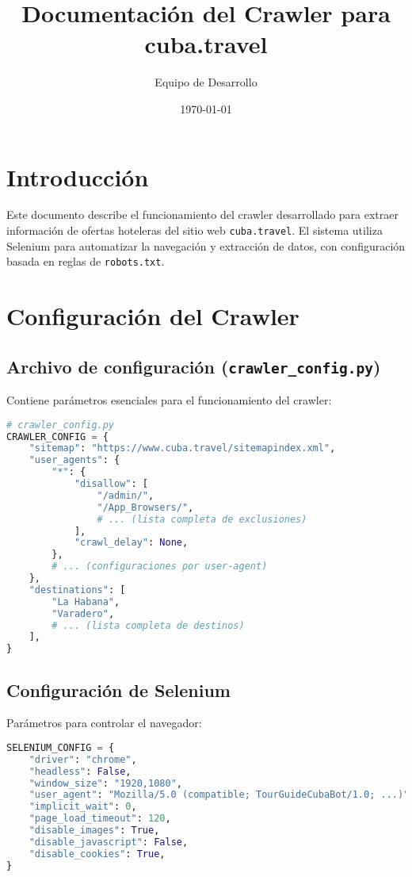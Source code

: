 \documentclass[a4paper,11pt]{article}
\title{Documentación del Crawler para cuba.travel}
\author{Equipo de Desarrollo}
\date{\today}
\begin{document}
\maketitle

\tableofcontents

\section{Introducción}
Este documento describe el funcionamiento del crawler desarrollado para extraer información de ofertas hoteleras del sitio web \texttt{cuba.travel}. El sistema utiliza Selenium para automatizar la navegación y extracción de datos, con configuración basada en reglas de \texttt{robots.txt}.

\section{Configuración del Crawler}
\subsection{Archivo de configuración (\texttt{crawler\_config.py})}
Contiene parámetros esenciales para el funcionamiento del crawler:

\begin{lstlisting}[language=Python, caption=Configuración principal]
# crawler_config.py
CRAWLER_CONFIG = {
    "sitemap": "https://www.cuba.travel/sitemapindex.xml",
    "user_agents": {
        "*": {
            "disallow": [
                "/admin/",
                "/App_Browsers/",
                # ... (lista completa de exclusiones)
            ],
            "crawl_delay": None,
        },
        # ... (configuraciones por user-agent)
    },
    "destinations": [
        "La Habana",
        "Varadero",
        # ... (lista completa de destinos)
    ],
}
\end{lstlisting}

\subsection{Configuración de Selenium}
Parámetros para controlar el navegador:

\begin{lstlisting}[language=Python, caption=Configuración de Selenium]
SELENIUM_CONFIG = {
    "driver": "chrome",
    "headless": False,
    "window_size": "1920,1080",
    "user_agent": "Mozilla/5.0 (compatible; TourGuideCubaBot/1.0; ...)",
    "implicit_wait": 0,
    "page_load_timeout": 120,
    "disable_images": True,
    "disable_javascript": False,
    "disable_cookies": True,
}
\end{lstlisting}
\end{document}
